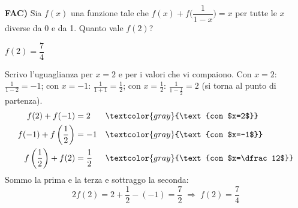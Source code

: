 \begin{question}[ID=fac.2, subtitle={FAC: funzione con $f(x)+f(1/(1-x))=x$, trovare $f(2)$}, headings=empty, difficulty=difficile, tags={funzioni,parametrico}]
\textbf{FAC)}
Sia $f(x)$ una funzione tale che $f(x) + f\Big(\dfrac{1}{1-x}\Big) = x$ per tutte le $x$ diverse da 0 e da 1. Quanto vale $f(2)$?
\begin{solution}
$f(2)=\dfrac74$
\end{solution}
\begin{explanation}
Scrivo l'uguaglianza per $x=2$ e per i valori che vi compaiono. Con $x=2$: $\tfrac{1}{1-2}=-1$; con $x=-1$: $\tfrac{1}{1+1}=\tfrac12$; con $x=\tfrac12$: $\tfrac{1}{1-\frac12}=2$ (si torna al punto di partenza).
\[\begin{aligned}
f(2)+f(-1) &= 2 && \textcolor{gray}{\text{con $x=2$}}\\
f(-1)+f\left(\dfrac12\right) &= -1 && \textcolor{gray}{\text{con $x=-1$}}\\
f\left(\dfrac12\right)+f(2) &= \dfrac12 && \textcolor{gray}{\text{con $x=\dfrac12$}}
\end{aligned}\]
Sommo la prima e la terza e sottraggo la seconda:
\[ 2f(2)=2+\dfrac12-(-1)=\dfrac72 \;\Rightarrow\; f(2)=\dfrac74 \]
\end{explanation}
\end{question}
